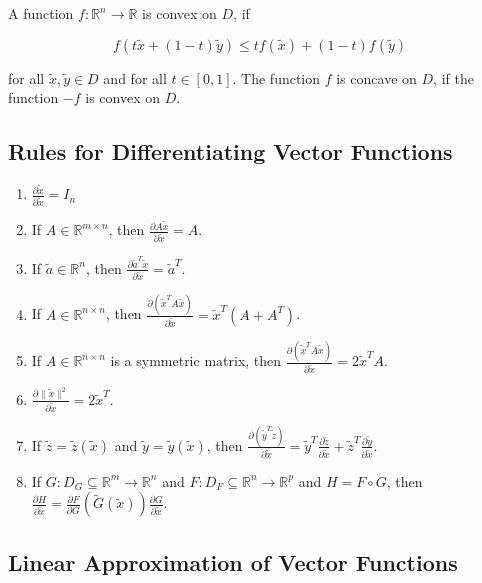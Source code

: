 \documentclass{article}
\begin{document}
\begin{multicols}{2}
	A function \( f: \mathbb{R}^n \rightarrow \mathbb{R} \) is convex on \( D \), if

	\[ f(t \tilde{x} + (1-t) \tilde{y}) \leq t f(\tilde{x}) + (1-t) f(\tilde{y}) \]

	for all \( \tilde{x}, \tilde{y} \in D \) and for all \( t \in [0, 1] \). The function \( f \) is concave on \( D \), if the function \( -f \) is convex on \( D \).

	\subsection{Rules for Differentiating Vector Functions}

	\begin{enumerate}
		\item \(\frac{\partial \tilde{x}}{\partial \tilde{x}} = I_n\)
		\item If \( A \in \mathbb{R}^{m \times n} \), then \( \frac{\partial A\tilde{x}}{\partial \tilde{x}} = A \).
		\item If \( \tilde{a} \in \mathbb{R}^n \), then \( \frac{\partial \tilde{a}^T\tilde{x}}{\partial \tilde{x}} = \tilde{a}^T \).
		\item If \( A \in \mathbb{R}^{n \times n} \), then \( \frac{\partial (\tilde{x}^T A\tilde{x})}{\partial \tilde{x}} = \tilde{x}^T(A + A^T) \).
		\item If \( A \in \mathbb{R}^{n \times n} \) is a symmetric matrix, then \( \frac{\partial (\tilde{x}^T A\tilde{x})}{\partial \tilde{x}} = 2\tilde{x}^T A \).
		\item \( \frac{\partial \|\tilde{x}\|^2}{\partial \tilde{x}} = 2\tilde{x}^T \).
		\item If \( \tilde{z} = \tilde{z}(\tilde{x}) \) and \( \tilde{y} = \tilde{y}(\tilde{x}) \), then \( \frac{\partial (\tilde{y}^T \tilde{z})}{\partial \tilde{x}} = \tilde{y}^T \frac{\partial \tilde{z}}{\partial \tilde{x}} + \tilde{z}^T \frac{\partial \tilde{y}}{\partial \tilde{x}} \).
		\item If \( G: D_G \subseteq \mathbb{R}^m \rightarrow \mathbb{R}^n \) and \( F: D_F \subseteq \mathbb{R}^n \rightarrow \mathbb{R}^p \) and \( H = F \circ G \), then \( \frac{\partial H}{\partial \tilde{x}} = \frac{\partial F}{\partial G} (\tilde{G}(\tilde{x})) \frac{\partial G}{\partial \tilde{x}} \).
	\end{enumerate}


	\subsection{Linear Approximation of Vector Functions}


\end{multicols}
\end{document}
